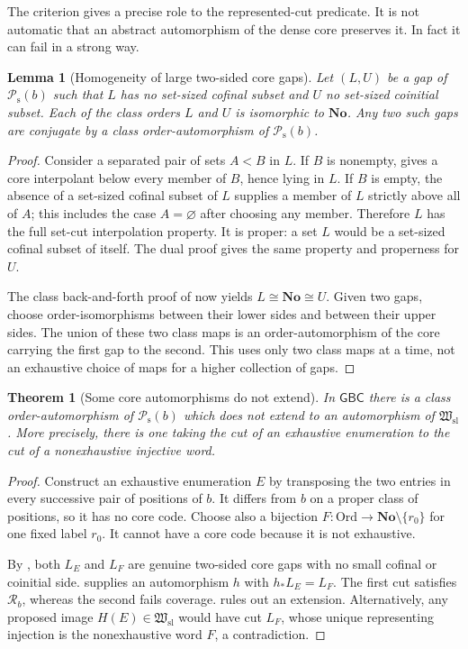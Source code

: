 \documentclass[11pt]{article}
\newtheorem{theorem}{Theorem}[section]
\newtheorem{lemma}[lemma]{Lemma}
\theoremstyle{definition}
\theoremstyle{remark}
\newcommand{\No}{\mathbf{No}}
\newcommand{\Ord}{\mathrm{Ord}}
\newcommand{\Hsl}{\mathfrak W_{\mathrm{sl}}}
\newcommand{\Psupp}{\mathcal P_{\mathrm{s}}}
\newcommand{\GBC}{\mathsf{GBC}}
\begin{document}
The criterion gives a precise role to the represented-cut predicate. It
is not automatic that an abstract automorphism of the dense core preserves
it. In fact it can fail in a strong way.

\begin{lemma}[Homogeneity of large two-sided core gaps]
\label{swo:gs:lem:gap-homogeneity}
Let $(L,U)$ be a gap of $\Psupp(b)$ such that $L$ has no set-sized cofinal
subset and $U$ no set-sized coinitial subset. Each of the class orders
$L$ and $U$ is isomorphic to $\No$. Any two such gaps are conjugate by a
class order-automorphism of $\Psupp(b)$.
\end{lemma}
\begin{proof}
Consider a separated pair of sets $A<B$ in $L$. If $B$ is nonempty,
 gives a core interpolant below every
member of $B$, hence lying in $L$. If $B$ is empty, the absence of a
set-sized cofinal subset of $L$ supplies a member of $L$ strictly above
all of $A$; this includes the case $A=\varnothing$ after choosing any
member. Therefore $L$ has the full set-cut interpolation property.
It is proper: a set $L$ would be a set-sized cofinal subset of itself.
The dual proof gives the same property and properness for $U$.

The class back-and-forth proof of 
now yields $L\cong\No\cong U$. Given two gaps, choose order-isomorphisms
between their lower sides and between their upper sides. The union of
these two class maps is an order-automorphism of the core carrying the
first gap to the second. This uses only two class maps at a time, not an
exhaustive choice of maps for a higher collection of gaps.
\end{proof}

\begin{theorem}[Some core automorphisms do not extend]
\label{swo:gs:thm:nonextension}
In $\GBC$ there is a class order-automorphism of $\Psupp(b)$ which does not
extend to an automorphism of $\Hsl$. More precisely, there is one taking
the cut of an exhaustive enumeration to the cut of a nonexhaustive
injective word.
\end{theorem}
\begin{proof}
Construct an exhaustive enumeration $E$ by transposing the two entries
in every successive pair of positions of $b$. It differs from $b$ on a
proper class of positions, so it has no core code. Choose also a bijection
$F:\Ord\to\No\setminus\{r_0\}$ for one fixed label $r_0$. It cannot
have a core code because it is not exhaustive.

By , both $L_E$ and $L_F$ are
genuine two-sided core gaps with no small cofinal or coinitial side.
 supplies an automorphism $h$ with
$h_*L_E=L_F$. The first cut satisfies $\mathscr R_b$, whereas the second
fails coverage.  rules out an
extension. Alternatively, any proposed image $H(E)\in \Hsl$ would have
cut $L_F$, whose unique representing injection is the nonexhaustive
word $F$, a contradiction.
\end{proof}
\end{document}
